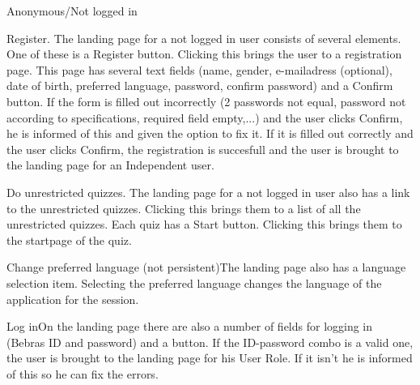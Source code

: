 \begin{section}{Anonymous/Not logged in}


    \begin{subsection}{Register.} The landing page for a not logged in user consists of several elements. One of these is a Register button. Clicking this brings the user to a registration page. This page has several text fields (name, gender, e-mailadress (optional), date of birth, preferred language, password, confirm password) and a Confirm button. If the form is filled out incorrectly (2 passwords not equal, password not according to specifications, required field empty,...) and the user clicks Confirm, he is informed of this and given the option to fix it. If it is filled out correctly and the user clicks Confirm, the registration is succesfull and the user is brought to the landing page for an Independent user.\end{subsection}
	\begin{subsection}{Do unrestricted quizzes.} The landing page for a not logged in user also has a link to the unrestricted quizzes. Clicking this brings them to a list of all the unrestricted quizzes. Each quiz has a Start button. Clicking this brings them to the startpage of the quiz.\end{subsection}
    \begin{subsection}{Change preferred language (not persistent)}The landing page also has a language selection item. Selecting the preferred language changes the language of the application for the session.\end{subsection}
    \begin{subsection}{Log in}On the landing page there are also a number of fields for logging in (Bebras ID and password) and a button. If the ID-password combo is a valid one, the user is brought to the landing page for his User Role. If it isn't he is informed of this so he can fix the errors. \end{subsection}


\end{section}
